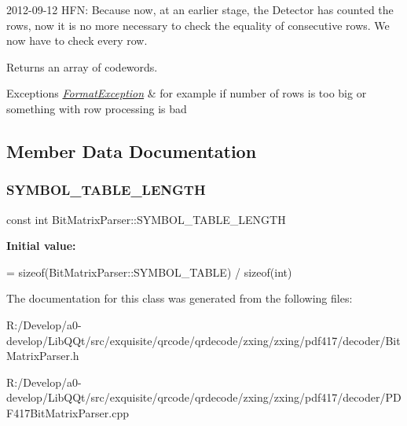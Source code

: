 2012-\/09-\/12 H\+FN\+: Because now, at an earlier stage, the Detector has counted the rows, now it is no more necessary to check the equality of consecutive rows. We now have to check every row.

\begin{DoxyReturn}{Returns}
an array of codewords. 
\end{DoxyReturn}

\begin{DoxyExceptions}{Exceptions}
{\em \mbox{\hyperlink{classzxing_1_1_format_exception}{Format\+Exception}}} & for example if number of rows is too big or something with row processing is bad \\
\hline
\end{DoxyExceptions}


\subsection{Member Data Documentation}
\mbox{\label{classzxing_1_1pdf417_1_1decoder_1_1_bit_matrix_parser_af15ac800a9ad4f4152513c98b169a89d}} 
\subsubsection{\texorpdfstring{S\+Y\+M\+B\+O\+L\+\_\+\+T\+A\+B\+L\+E\+\_\+\+L\+E\+N\+G\+TH}{SYMBOL\_TABLE\_LENGTH}}
{\footnotesize\ttfamily const int Bit\+Matrix\+Parser\+::\+S\+Y\+M\+B\+O\+L\+\_\+\+T\+A\+B\+L\+E\+\_\+\+L\+E\+N\+G\+TH\hspace{0.3cm}{\ttfamily [static]}}

{\bfseries Initial value\+:}
\begin{DoxyCode}
=
    \textcolor{keyword}{sizeof}(BitMatrixParser::SYMBOL\_TABLE) / \textcolor{keyword}{sizeof}(\textcolor{keywordtype}{int})
\end{DoxyCode}


The documentation for this class was generated from the following files\+:\begin{DoxyCompactItemize}
\item 
R\+:/\+Develop/a0-\/develop/\+Lib\+Q\+Qt/src/exquisite/qrcode/qrdecode/zxing/zxing/pdf417/decoder/Bit\+Matrix\+Parser.\+h\item 
R\+:/\+Develop/a0-\/develop/\+Lib\+Q\+Qt/src/exquisite/qrcode/qrdecode/zxing/zxing/pdf417/decoder/P\+D\+F417\+Bit\+Matrix\+Parser.\+cpp\end{DoxyCompactItemize}
